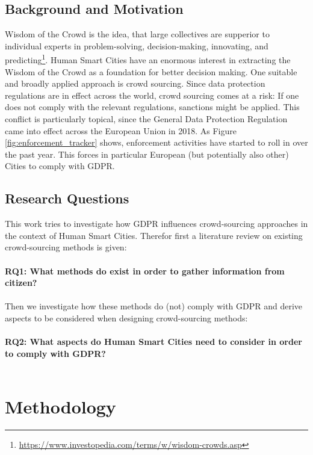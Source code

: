 \documentclass[a4paper,12pt]{report}
\begin{document}
	\section{Background and Motivation}
	\startsection
		Wisdom of the Crowd is the idea, that large collectives are supperior to individual experts in problem-solving, decision-making, innovating, and predicting\footnote{\url{https://www.investopedia.com/terms/w/wisdom-crowds.asp}}. 
		Human Smart Cities have an enormous interest in extracting the Wisdom of the Crowd as a foundation for better decision making.
		One suitable and broadly applied approach is crowd sourcing.
		Since data protection regulations are in effect across the world, crowd sourcing comes at a risk: If one does not comply with the relevant regulations, sanctions might be applied.
		This conflict is particularly topical, since the General Data Protection Regulation came into effect across the European Union in 2018.
		As Figure \ref{fig:enforcement_tracker} shows, enforcement activities have started to roll in over the past year. This forces in particular European (but potentially also other) Cities to comply with GDPR.
	\closesection

	\section{Research Questions}
	\startsection
		This work tries to investigate how GDPR influences crowd-sourcing approaches in the context of Human Smart Cities.
		Therefor first a literature review on existing crowd-sourcing methods is given:\\\\
		\textbf{RQ1: What methods do exist in order to gather information from citizen?}\\\\
		Then we investigate how these methods do (not) comply with GDPR and derive aspects to be considered when designing crowd-sourcing methods:\\\\
		\textbf{RQ2: What aspects do Human Smart Cities need to consider in order to comply with GDPR?}\\\\
	\closesection
	
	
	\chapter{Methodology}
\end{document}
